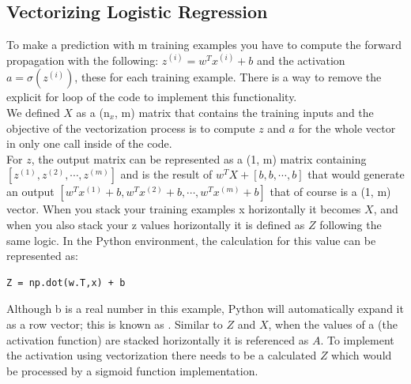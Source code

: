 \documentclass[11pt]{report}
\begin{document}
\subsection{Vectorizing Logistic Regression}
To make a prediction with m training examples you have to compute the forward propagation with the following: $z^{(i)}=w^Tx^{(i)}+b$ and the activation $a=\sigma(z^{(i)})$, these for each training example. There is a way to remove the explicit for loop of the code to implement this functionality.\\
We defined $X$ as a (n$_x$, m) matrix that contains the training inputs and the objective of the vectorization process is to compute $z$ and $a$ for the whole vector in only one call inside of the code.\\
For $z$, the output matrix can be represented as a (1, m) matrix containing $[z^{(1)}, z^{(2)}, \cdots, z^{(m)}]$ and is the result of $w^TX+[b, b, \cdots, b]$ that would generate an output $[w^Tx^{(1)}+b, w^Tx^{(2)}+b, \cdots, w^Tx^{(m)}+b]$ that of course is a (1, m) vector. When you stack your training examples x horizontally it becomes $X$, and when you also stack your z values horizontally it is defined as $Z$ following the same logic. In the Python environment, the calculation for this value can be represented as:
\begin{lstlisting}[mathescape=true]
Z = np.dot(w.T,x) + b
\end{lstlisting}
Although b is a real number in this example, Python will automatically expand it as a row vector; this is known as . Similar to $Z$ and $X$, when the values of a (the activation function) are stacked horizontally it is referenced as $A$. To implement the activation using vectorization there needs to be a calculated $Z$ which would be processed by a sigmoid function implementation.
\end{document}
